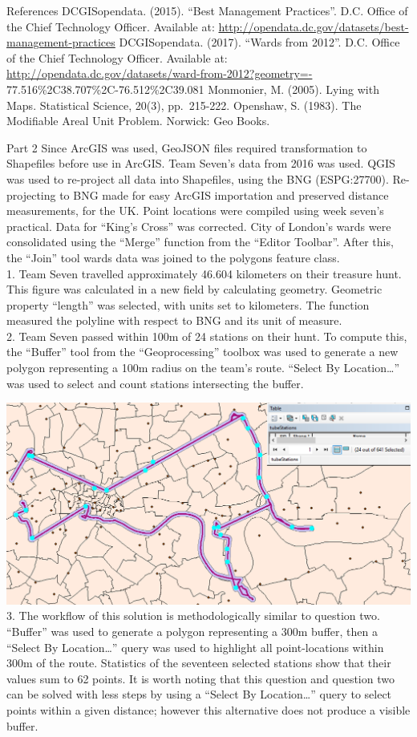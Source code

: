\documentclass[]{article}
\begin{document}
References DCGISopendata. (2015). ``Best Management Practices''. D.C.
Office of the Chief Technology Officer. Available at:
\url{http://opendata.dc.gov/datasets/best-management-practices}
DCGISopendata. (2017). ``Wards from 2012''. D.C. Office of the Chief
Technology Officer. Available at:
\url{http://opendata.dc.gov/datasets/ward-from-2012?geometry=-}
77.516\%2C38.707\%2C-76.512\%2C39.081 Monmonier, M. (2005). Lying with
Maps. Statistical Science, 20(3), pp.~215-222. Openshaw, S. (1983). The
Modifiable Areal Unit Problem. Norwick: Geo Books.

Part 2 Since ArcGIS was used, GeoJSON files required transformation to
Shapefiles before use in ArcGIS. Team Seven's data from 2016 was used.
QGIS was used to re-project all data into Shapefiles, using the BNG
(ESPG:27700). Re-projecting to BNG made for easy ArcGIS importation and
preserved distance measurements, for the UK. Point locations were
compiled using week seven's practical. Data for ``King's Cross'' was
corrected. City of London's wards were consolidated using the ``Merge''
function from the ``Editor Toolbar''. After this, the ``Join'' tool
wards data was joined to the polygons feature class.\\
1. Team Seven travelled approximately 46.604 kilometers on their
treasure hunt. This figure was calculated in a new field by calculating
geometry. Geometric property ``length'' was selected, with units set to
kilometers. The function measured the polyline with respect to BNG and
its unit of measure.\\
2. Team Seven passed within 100m of 24 stations on their hunt. To
compute this, the ``Buffer'' tool from the ``Geoprocessing'' toolbox was
used to generate a new polygon representing a 100m radius on the team's
route. ``Select By Location\ldots{}'' was used to select and count
stations intersecting the buffer.

\includegraphics[width=27.79in]{3} 3. The workflow of this solution is
methodologically similar to question two. ``Buffer'' was used to
generate a polygon representing a 300m buffer, then a ``Select By
Location\ldots{}'' query was used to highlight all point-locations
within 300m of the route. Statistics of the seventeen selected stations
show that their values sum to 62 points. It is worth noting that this
question and question two can be solved with less steps by using a
``Select By Location\ldots{}'' query to select points within a given
distance; however this alternative does not produce a visible buffer.
\end{document}
